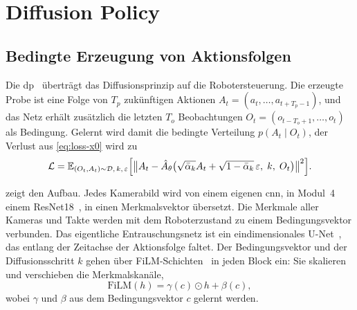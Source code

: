 \section{Diffusion Policy}
\label{sec:dp}

\subsection{Bedingte Erzeugung von Aktionsfolgen}

Die \ac{dp}~\cite{chi2024} überträgt das Diffusionsprinzip auf die Robotersteuerung. Die
erzeugte Probe ist eine Folge von $T_p$ zukünftigen Aktionen
$A_t = (a_t, \dots, a_{t+T_p-1})$, und das Netz erhält zusätzlich die letzten $T_o$
Beobachtungen $O_t = (o_{t-T_o+1}, \dots, o_t)$ als Bedingung. Gelernt wird damit die bedingte
Verteilung $p(A_t \mid O_t)$, der Verlust aus \cref{eq:loss-x0} wird zu
\begin{equation}
  \mathcal{L} = \mathbb{E}_{(O_t, A_t) \sim \mathcal{D},\,k,\,\varepsilon}
    \Bigl[\bigl\lVert A_t - \hat A_\theta\bigl(\sqrt{\bar\alpha_k}A_t
      + \sqrt{1-\bar\alpha_k}\,\varepsilon,\; k,\; O_t\bigr)\bigr\rVert^2\Bigr] .
  \label{eq:loss-dp}
\end{equation}

 zeigt den Aufbau. Jedes Kamerabild wird von einem eigenen \ac{cnn}, in
Modul~4 einem ResNet18~\cite{he2016}, in einen Merkmalsvektor übersetzt. Die Merkmale aller
Kameras und Takte werden mit dem Roboterzustand zu einem Bedingungsvektor verbunden. Das
eigentliche Entrauschungsnetz ist ein eindimensionales U-Net~\cite{ronneberger2015}, das
entlang der Zeitachse der Aktionsfolge faltet. Der Bedingungsvektor und der Diffusionsschritt
$k$ gehen über FiLM-Schichten~\cite{perez2018} in jeden Block ein: Sie skalieren und
verschieben die Merkmalskanäle,
\begin{equation}
  \mathrm{FiLM}(h) = \gamma(c) \odot h + \beta(c) ,
\end{equation}
wobei $\gamma$ und $\beta$ aus dem Bedingungsvektor $c$ gelernt werden.

